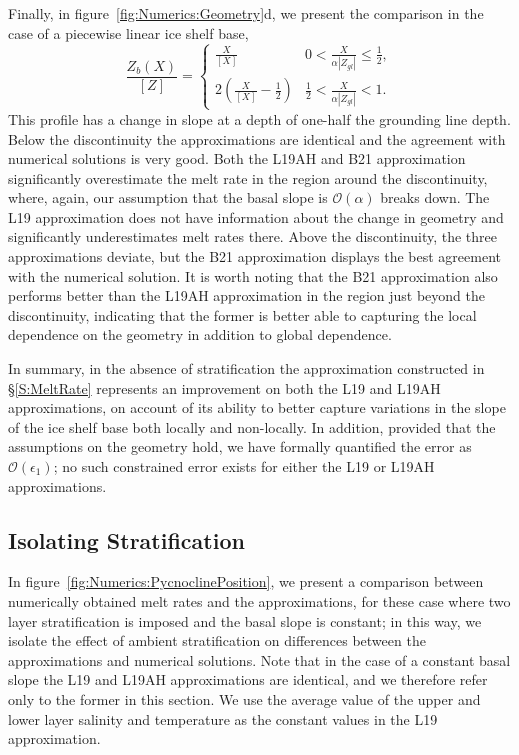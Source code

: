 \documentclass[openacc]{rsproca_new}%
\newcommand{\order}[1]{\mathcal{O}(#1)}
\newcommand{\epsone}{\epsilon_{1}} %
\begin{document}
Finally, in figure~\ref{fig:Numerics:Geometry}d, we present the comparison in the case of a piecewise linear ice shelf base,
\begin{equation}\label{E:Numerics:PiecewiseGeometry}
\frac{Z_b(X)}{\left[Z\right]} = \begin{cases}
  \frac{X}{\left[X\right]}  & 0 <   \frac{X}{\alpha |Z_{gl}|} \leq   \frac{1}{2},\\
   2 \left(\frac{X}{\left[X\right]} -\frac{1}{2}\right)  &  \frac{1}{2} <   \frac{X}{\alpha |Z_{gl}|} <   1.
    \end{cases}
\end{equation}
This profile has a change in slope at a depth of one-half the grounding line depth. Below the discontinuity the approximations are identical and the agreement with numerical solutions is very good. Both the L19AH and B21 approximation significantly overestimate the melt rate in the region around the discontinuity, where, again, our assumption that the basal slope is $\order{\alpha}$ breaks down. The L19 approximation does not have information about the change in geometry and significantly underestimates melt rates there. Above the discontinuity, the three approximations deviate, but the B21 approximation displays the best agreement with the numerical solution. It is worth noting that the B21 approximation also performs better than the L19AH approximation in the region just beyond the discontinuity, indicating that the former is better able to capturing the local dependence on the geometry in addition to global dependence. 

In summary, in the absence of stratification the approximation constructed in \S\ref{S:MeltRate} represents an improvement on both the L19 and L19AH approximations, on account of its ability to better capture variations in the slope of the ice shelf base both locally and non-locally. In addition, provided that the assumptions on the geometry hold, we have formally quantified the error as $\order{\epsone}$; no such constrained error exists for either the L19 or L19AH approximations. 

\subsection{Isolating Stratification}
In figure~\ref{fig:Numerics:PycnoclinePosition}, we present a comparison between numerically obtained melt rates and the approximations, for these case where two layer stratification is imposed and the basal slope is constant; in this way, we isolate the effect of ambient stratification on differences between the approximations and numerical solutions. Note that in the case of a constant basal slope the L19 and L19AH approximations are identical, and we therefore refer only to the former in this section. We use the average value of the upper and lower layer salinity and temperature as the constant values in the L19 approximation.
\end{document}
